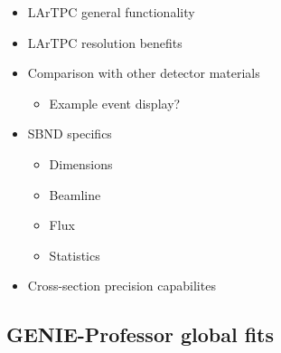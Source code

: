    \begin{itemize}

        \item LArTPC general functionality
        \item LArTPC resolution benefits
        \item Comparison with other detector materials
            \begin{itemize}
                \item Example event display?
            \end{itemize}
        \item SBND specifics

        \begin{itemize}

            \item Dimensions
            \item Beamline
            \item Flux
            \item Statistics

        \end{itemize}

        \item Cross-section precision capabilites

    \end{itemize}

\subsection{GENIE-Professor global fits}


\clearpage
